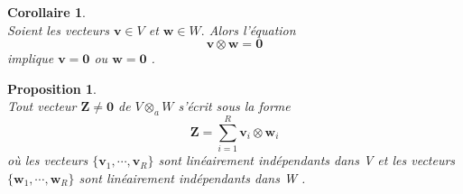 \documentclass[11pt,a4paper,oneside]{book}
\newtheorem{prop}{Proposition}[chapter]
\newtheorem{cor}{Corollaire}[chapter]
\def\ov{\mathbf 0}
\def\v{\mathbf v}
\def\z{\mathbf Z}
\def\w{\mathbf w}
\begin{document}
\begin{cor}\label{cor:6}
\emph{\\}
Soient les vecteurs $ \v\in V $ et $ \w\in W. $ Alors l'équation \begin{equation}
\v\otimes \w=\ov
\end{equation}implique $ \v=\ov $ ou $ \w=\ov $ \cite[p.104]{Michel2013}.
\end{cor}
\begin{prop}\label{prop1.5}
\emph{\\}
Tout vecteur $ \z\neq \ov $ de $ V\otimes_{a} W $ s'écrit sous la forme
\begin{equation}\label{0.1}
\z=\sum_{i=1}^{R}\v_{i}\otimes\w_{i}
\end{equation} où les vecteurs $ \{\v_{1},\cdots,\v_{R}\} $ sont linéairement indépendants dans V et les vecteurs $ \{\w_{1},\cdots,\w_{R}\} $ sont linéairement indépendants dans W \cite[p.54]{hackbusch2012tensor}.
\end{prop}
\end{document}
